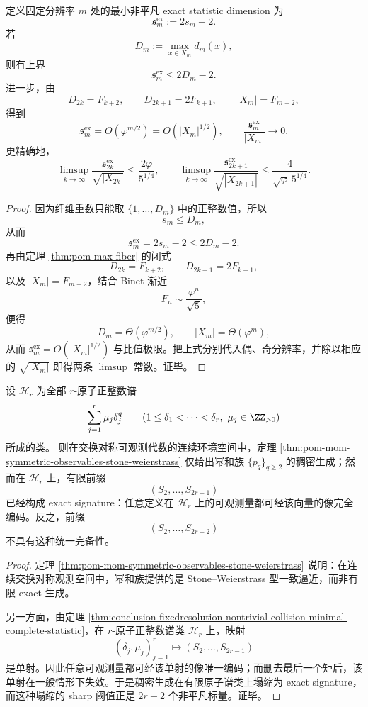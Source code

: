 \begin{corollary}[精确统计维数的平方根塌缩律]\label{cor:conclusion-fixedresolution-exact-statistic-dimension-squareroot-collapse}
定义固定分辨率 \(m\) 处的最小非平凡 exact statistic dimension 为
\[
\mathfrak s_m^{\mathrm{ex}}:=2s_m-2.
\]
若
\[
D_m:=\max_{x\in X_m}d_m(x),
\]
则有上界
\[
\mathfrak s_m^{\mathrm{ex}}\le 2D_m-2.
\]
进一步，由
\[
D_{2k}=F_{k+2},
\qquad
D_{2k+1}=2F_{k+1},
\qquad
|X_m|=F_{m+2},
\]
得到
\[
\mathfrak s_m^{\mathrm{ex}}=O(\varphi^{m/2})=O(|X_m|^{1/2}),
\qquad
\frac{\mathfrak s_m^{\mathrm{ex}}}{|X_m|}\longrightarrow 0.
\]
更精确地，
\[
\limsup_{k\to\infty}\frac{\mathfrak s_{2k}^{\mathrm{ex}}}{\sqrt{|X_{2k}|}}
\le
\frac{2\varphi}{5^{1/4}},
\qquad
\limsup_{k\to\infty}\frac{\mathfrak s_{2k+1}^{\mathrm{ex}}}{\sqrt{|X_{2k+1}|}}
\le
\frac{4}{\sqrt{\varphi}\,5^{1/4}}.
\]
\end{corollary}
\begin{proof}
因为纤维重数只能取 \(\{1,\dots,D_m\}\) 中的正整数值，所以
\[
s_m\le D_m,
\]
从而
\[
\mathfrak s_m^{\mathrm{ex}}=2s_m-2\le 2D_m-2.
\]
再由定理 \ref{thm:pom-max-fiber} 的闭式
\[
D_{2k}=F_{k+2},
\qquad
D_{2k+1}=2F_{k+1},
\]
以及 \(|X_m|=F_{m+2}\)，结合 Binet 渐近
\[
F_n\sim \frac{\varphi^n}{\sqrt5},
\]
便得
\[
D_m=\Theta(\varphi^{m/2}),
\qquad
|X_m|=\Theta(\varphi^m),
\]
从而
\(
\mathfrak s_m^{\mathrm{ex}}=O(|X_m|^{1/2})
\)
与比值极限。把上式分别代入偶、奇分辨率，并除以相应的 \(\sqrt{|X_m|}\) 即得两条 \(\limsup\) 常数。证毕。
\end{proof}

\begin{theorem}\label{thm:conclusion-r-atomic-spectrum-exact-signature-collapse}
设 \(\mathscr H_r\) 为全部 \(r\)-原子正整数谱
\[
\sum_{j=1}^{r}\mu_j\delta_j^q
\qquad
(1\le \delta_1<\cdots<\delta_r,\ \mu_j\in\ZZ_{>0})
\]
所成的类。
则在交换对称可观测代数的连续环境空间中，定理 \ref{thm:pom-mom-symmetric-observables-stone-weierstrass} 仅给出幂和族 \(\{p_q\}_{q\ge 2}\) 的稠密生成；然而在 \(\mathscr H_r\) 上，有限前缀
\[
(S_2,\dots,S_{2r-1})
\]
已经构成 exact signature：任意定义在 \(\mathscr H_r\) 上的可观测量都可经该向量的像完全编码。反之，前缀
\[
(S_2,\dots,S_{2r-2})
\]
不具有这种统一完备性。
\end{theorem}
\begin{proof}
定理 \ref{thm:pom-mom-symmetric-observables-stone-weierstrass} 说明：在连续交换对称观测空间中，幂和族提供的是 Stone--Weierstrass 型一致逼近，而非有限 exact 生成。

另一方面，由定理 \ref{thm:conclusion-fixedresolution-nontrivial-collision-minimal-complete-statistic}，在 \(r\)-原子正整数谱类 \(\mathscr H_r\) 上，映射
\[
(\delta_j,\mu_j)_{j=1}^{r}
\longmapsto
(S_2,\dots,S_{2r-1})
\]
是单射。因此任意可观测量都可经该单射的像唯一编码；而删去最后一个矩后，该单射在一般情形下失效。于是稠密生成在有限原子谱类上塌缩为 exact signature，而这种塌缩的 sharp 阈值正是 \(2r-2\) 个非平凡标量。证毕。
\end{proof}

